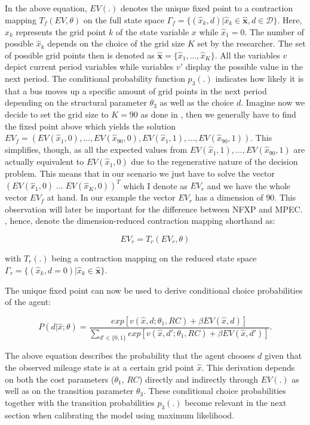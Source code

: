 In the above equation, $EV(.)$ denotes the unique fixed point to a contraction mapping $T_f(EV, \theta)$ on the full state space $\Gamma_f = \{(\hat x_k, d)|\hat x_k \in \mathbf{\hat x}, d \in \mathcal{D}\}$. Here, $\hat x_k$ represents the grid point $k$ of the state variable $x$ while $\hat x_1 = 0$. The number of possible $\hat x_k$ depends on the choice of the grid size $K$ set by the researcher. The set of possible grid points then is denoted as $\mathbf{\hat x} = \{\hat x_1, ..., \hat x_K\}$. All the variables $v$ depict current period variables while variables $v'$ display the possible value in the next period. The conditional probability function $p_3(.)$ indicates how likely it is that a bus moves up a specific amount of grid points in the next period depending on the structural parameter $\theta_3$ as well as the choice $d$. Imagine now we decide to set the grid size to $K=90$ as done in \cite{Rust.1987}, then we generally have to find the fixed point above which yields the solution $EV_f = (EV(\hat x_1, 0), ..., EV(\hat x_{90}, 0), EV(\hat x_1, 1), ..., EV(\hat x_{90}, 1))$. This simplifies, though, as all the expected values from $EV(\hat x_1, 1), ..., EV(\hat x_{90}, 1)$ are actually equivalent to $EV(\hat x_1, 0)$ due to the regenerative nature of the decision problem. This means that in our scenario we just have to solve the vector $(EV(\hat x_1, 0)\; ...\; EV(\hat x_K, 0))^T$ which I denote as $EV_r$ and we have the whole vector $EV_f$ at hand. In our example the vector $EV_r$ has a dimension of $90$. This observation will later be important for the difference between NFXP and MPEC. \cite{Su.Judd.2012}, hence, denote the dimension-reduced contraction mapping shorthand as:

\begin{equation}
EV_r = T_r(EV_r, \theta)
\end{equation}

with $T_r(.)$ being a contraction mapping on the reduced state space $\Gamma_r = \{(\hat x_k, d=0)|\hat x_k \in \mathbf{\hat x}\}$.

The unique fixed point can now be used to derive conditional choice probabilities of the agent:

\begin{equation}
	\label{eq11}
	P(d|\hat x; \theta) = \frac{exp[v(\hat x, d; \theta_1, RC) + \beta EV(\hat x, d)]}{\sum_{d' \in \{0, 1\}} exp[v(\hat x, d'; \theta_1, RC) + \beta EV(\hat x, d')]}.
\end{equation}

The above equation describes the probability that the agent chooses $d$ given that the observed mileage state is at a certain grid point $\hat x$. This derivation depends on both the cost parameters ($\theta_1$, $RC$) directly and indirectly through $EV(.)$ as well as on the transition parameter $\theta_3$. These conditional choice probabilities together with the transition probabilities $p_3(.)$ become relevant in the next section when calibrating the model using maximum likelihood.


